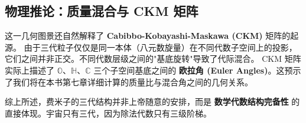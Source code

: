 \subsection{物理推论：质量混合与 CKM 矩阵}

这一几何图景还自然解释了 \textbf{Cabibbo-Kobayashi-Maskawa (CKM)} 矩阵的起源。
由于三代粒子仅仅是同一本体（八元数旋量）在不同代数子空间上的投影，它们之间并非正交。不同代数层级之间的"基底旋转"导致了代际混合。
CKM 矩阵实际上描述了 $\mathbb{O}$、$\mathbb{H}$、$\mathbb{C}$ 三个子空间基底之间的 \textbf{欧拉角 (Euler Angles)}。这预示了我们将在本书第七章详细计算的质量比与混合角之间的几何关系。

综上所述，费米子的三代结构并非上帝随意的安排，而是 \textbf{数学代数结构完备性} 的直接体现。宇宙只有三代，因为除法代数只有三级阶梯。

